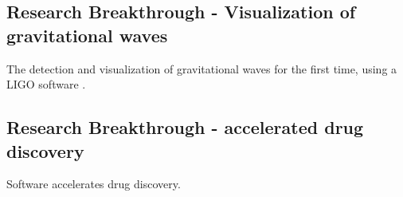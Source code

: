 \subsection{Research Breakthrough - Visualization of gravitational waves }
The detection and visualization of gravitational waves for the first time, using a \ac{LIGO} software \citep{enwiki:1047100294, mukherji2017report}. 

\subsection{Research Breakthrough - accelerated drug discovery }
Software accelerates drug discovery\citep{bhati2021pandemic}.



